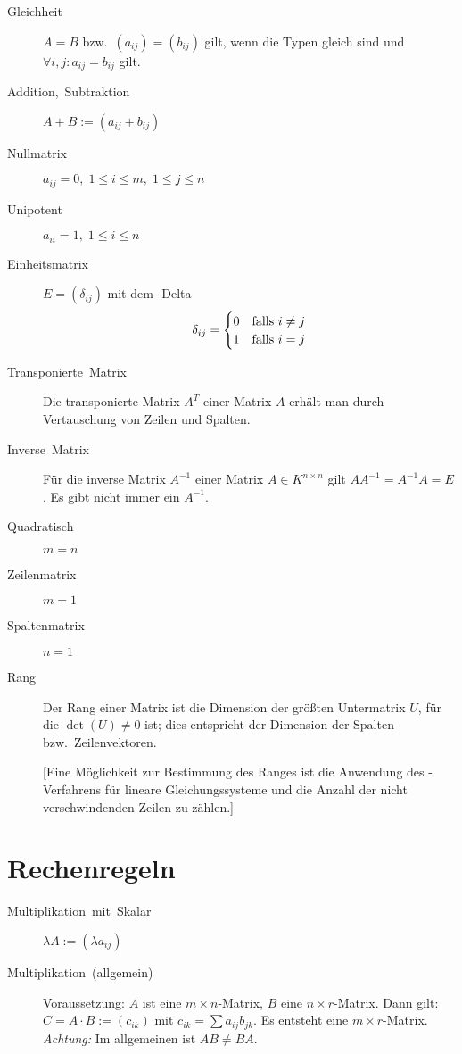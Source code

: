 \begin{description}
  \item [{Gleichheit}]
	$A=B$ bzw.~$(a_{ij})=(b_{ij})$ gilt, wenn die Typen gleich sind und $\forall i,j:a_{ij}=b_{ij}$ gilt.
  \item [{Addition,~Subtraktion}]
	$A+B:=(a_{ij}+b_{ij})$
  \item [{Nullmatrix}] 
	$a_{ij}=0,\; 1 \leq i \leq m,\; 1 \leq j \leq n$
  \item [{Unipotent}] 
	$a_{ii}=1,\; 1 \leq i \leq n$
  \item [{Einheitsmatrix}] 
	$E=(\delta_{ij})$ mit dem -Delta
	\[
	  \delta_{ij}=\begin{cases}
	    0 & \hbox{falls $i\neq j$}\\
	    1 & \hbox{falls $i=j$}
	  \end{cases}
	\]
  \item [{Transponierte~Matrix}] 
	Die transponierte Matrix $A^T$ einer Matrix $A$ erhält man durch Vertauschung von Zeilen und Spalten.
  \item [{Inverse~Matrix}] 
	Für die inverse Matrix $A^{-1}$ einer Matrix $A \in K^{n \times n}$ gilt $AA^{-1}=A^{-1}A=E$. Es gibt nicht immer ein $A^{-1}$.
  \item [{Quadratisch}] 
	$m=n$
  \item [{Zeilenmatrix}] 
	$m=1$
  \item [{Spaltenmatrix}] 
	$n=1$
  \item [{Rang}] 
	Der Rang einer Matrix ist die Dimension der größten Untermatrix $U$, für die $\det(U)\neq0$ ist; dies entspricht der Dimension der Spalten- bzw.~Zeilenvektoren.

    [Eine Möglichkeit zur Bestimmung des Ranges ist die Anwendung des -Verfahrens für lineare Gleichungssysteme und die Anzahl der nicht verschwindenden Zeilen zu zählen.]
\end{description}

\section{Rechenregeln}
\begin{description}
  \item [{Multiplikation~mit~Skalar}]
	$\lambda A:=(\lambda a_{ij})$
  \item [{Multiplikation~(allgemein)}]
	Voraussetzung: $A$ ist eine $m\times n$-Matrix, $B$ eine $n\times r$-Matrix.
	Dann gilt: $C=A\cdot B:=(c_{ik})$ mit $c_{ik}=\sum a_{ij} b_{jk}$.
	Es entsteht eine $m\times r$-Matrix.
	\emph{Achtung:} Im allgemeinen ist $AB\neq BA$.
\end{description}

